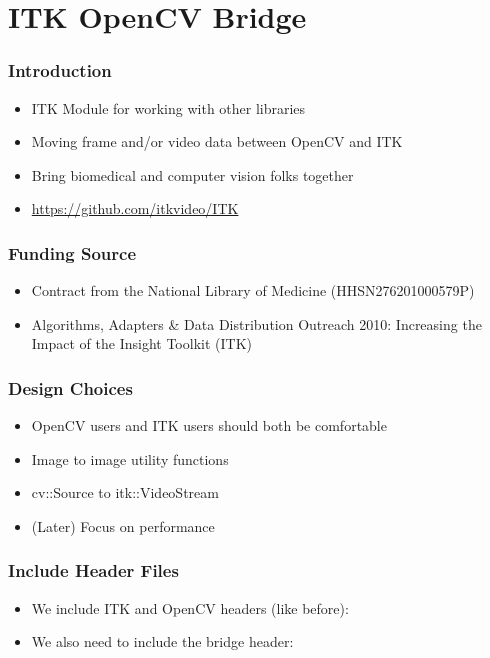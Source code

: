 \section{ITK OpenCV Bridge}



\begin{frame}
\frametitle{Introduction}
\begin{itemize}
\item ITK Module for working with other libraries
\item Moving frame and/or video data between OpenCV and ITK
\item Bring biomedical and computer vision folks together
\item \url{https://github.com/itkvideo/ITK}
\end{itemize}
\end{frame}

\begin{frame}
\frametitle{Funding Source}
\begin{itemize}
\item Contract from the National Library of Medicine (HHSN276201000579P)
\item Algorithms, Adapters \& Data Distribution Outreach 2010:
  Increasing the Impact of the Insight Toolkit (ITK)
\end{itemize}
\end{frame}

\begin{frame}
\frametitle{Design Choices}
\begin{itemize}
\item OpenCV users and ITK users should both be comfortable
\item Image to image utility functions
\item cv::Source to itk::VideoStream
\item (Later) Focus on performance
\end{itemize}
\end{frame}



\begin{frame}
\frametitle{Include Header Files}
\begin{itemize}
\item We include ITK and OpenCV headers (like before):
\item We also need to include the bridge header:
\end{itemize}
\end{frame}

